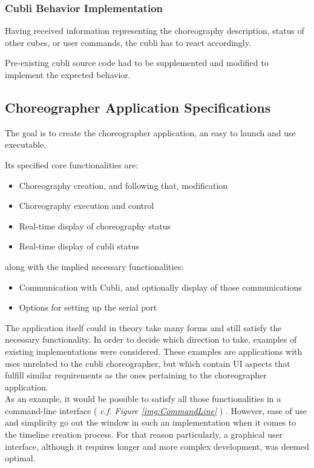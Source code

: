\subsubsection{Cubli Behavior Implementation}

Having received information representing the choreography description, status of other cubes, or user commands, the cubli has to react accordingly.

Pre-existing cubli source code had to be supplemented and modified to implement the expected behavior.




\subsection{Choreographer Application Specifications}

The goal is to create the choreographer application, an easy to launch and use executable.

Its specified core functionalities are:

\begin{itemize}
\item Choreography creation, and following that, modification
\item Choreography execution and control
\item Real-time display of choreography status
\item Real-time display of cubli status
\end{itemize}

along with the implied necessary functionalities:

\begin{itemize}
\item Communication with Cubli, and optionally display of those communications
\item Options for setting up the serial port
\end{itemize}


The application itself could in theory take many forms and still satisfy the necessary functionality. In order to decide which direction to take, examples of existing implementations were considered. These examples are applications with uses unrelated to the cubli choreographer, but which contain UI aspects that fulfill similar requirements as the ones pertaining to the choreographer application.\\

As an example, it would be possible to satisfy all those functionalities in a command-line interface ( \textit{c.f. Figure \ref{img:CommandLine}} ) . However, ease of use and simplicity go out the window in such an implementation when it comes to the timeline creation process. For that reason particularly, a graphical user interface, although it requires longer and more complex development, was deemed optimal.\\

